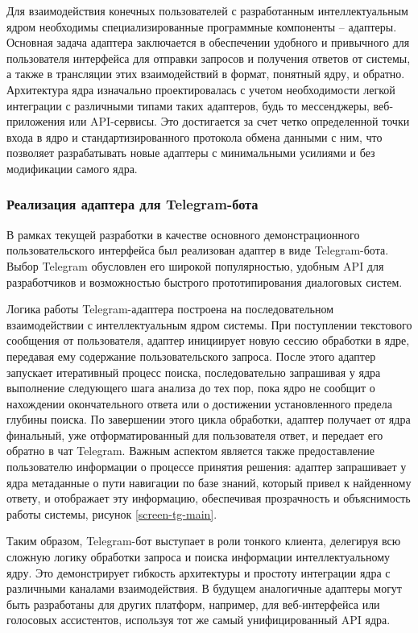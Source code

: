 Для взаимодействия конечных пользователей с разработанным интеллектуальным ядром необходимы специализированные программные компоненты – адаптеры. Основная задача адаптера заключается в обеспечении удобного и привычного для пользователя интерфейса для отправки запросов и получения ответов от системы, а также в трансляции этих взаимодействий в формат, понятный ядру, и обратно. Архитектура ядра изначально проектировалась с учетом необходимости легкой интеграции с различными типами таких адаптеров, будь то мессенджеры, веб-приложения или API-сервисы. Это достигается за счет четко определенной точки входа в ядро и стандартизированного протокола обмена данными с ним, что позволяет разрабатывать новые адаптеры с минимальными усилиями и без модификации самого ядра.

\subsubsection{Реализация адаптера для Telegram-бота}

В рамках текущей разработки в качестве основного демонстрационного пользовательского интерфейса был реализован адаптер в виде Telegram-бота. Выбор Telegram обусловлен его широкой популярностью, удобным API для разработчиков и возможностью быстрого прототипирования диалоговых систем.


Логика работы Telegram-адаптера построена на последовательном взаимодействии с интеллектуальным ядром системы. При поступлении текстового сообщения от пользователя, адаптер инициирует новую сессию обработки в ядре, передавая ему содержание пользовательского запроса. После этого адаптер запускает итеративный процесс поиска, последовательно запрашивая у ядра выполнение следующего шага анализа до тех пор, пока ядро не сообщит о нахождении окончательного ответа или о достижении установленного предела глубины поиска. По завершении этого цикла обработки, адаптер получает от ядра финальный, уже отформатированный для пользователя ответ, и передает его обратно в чат Telegram. Важным аспектом является также предоставление пользователю информации о процессе принятия решения: адаптер запрашивает у ядра метаданные о пути навигации по базе знаний, который привел к найденному ответу, и отображает эту информацию, обеспечивая прозрачность и объяснимость работы системы, рисунок \ref{screen-tg-main}.

Таким образом, Telegram-бот выступает в роли тонкого клиента, делегируя всю сложную логику обработки запроса и поиска информации интеллектуальному ядру. Это демонстрирует гибкость архитектуры и простоту интеграции ядра с различными каналами взаимодействия. В будущем аналогичные адаптеры могут быть разработаны для других платформ, например, для веб-интерфейса или голосовых ассистентов, используя тот же самый унифицированный API ядра.

